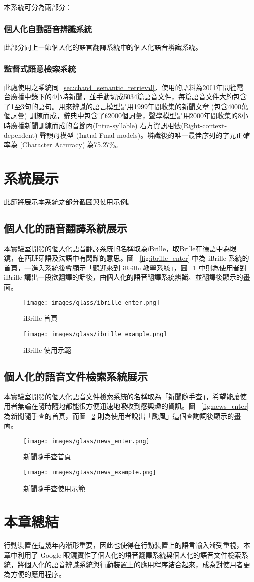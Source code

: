本系統可分為兩部分：

\subsubsection{個人化自動語音辨識系統}

此部分同上一節個人化的語言翻譯系統中的個人化語音辨識系統。

\subsubsection{監督式語意檢索系統}

此處使用之系統同~\ref{sec:chap4_semantic_retrieval}，使用的語料為2001年間從電台廣播中錄下的4小時新聞，並手動切成5034篇語音文件，每篇語音文件大約包含了1至3句的語句。用來辨識的語言模型是用1999年間收集的新聞文章 (包含4000萬個詞彙) 訓練而成，辭典中包含了62000個詞彙，聲學模型是用2000年間收集的8小時廣播新聞訓練而成的音節內(Intra-syllable)
右方資訊相依(Right-context-dependent) 聲韻母模型 (Initial-Final models)。辨識後的唯一最佳序列的字元正確率為 (Character Accuracy) 為75.27\%。
\section{系統展示}
此節將展示本系統之部分截圖與使用示例。

\subsection{個人化的語音翻譯系統展示}
本實驗室開發的個人化語音翻譯系統的名稱取為iBrille，取Brille在德語中為眼鏡，在西班牙語及法語中有閃耀的意思。圖 ~\ref{fig:ibrille_enter} 中為 iBrille 系統的首頁，一進入系統後會顯示「觀迎來到 iBrille 教學系統」，圖 ~\ref{fig:ibrille_example} 中則為使用者對 iBrille 講出一段欲翻譯的話後，由個人化的語音翻譯系統辨識、並翻譯後顯示的畫面。
\begin{figure}
\centering
\texttt{[image: images/glass/ibrille\_enter.png]}
\caption{iBrille 首頁} \label{fig:ibrille_enter}
\centering
\texttt{[image: images/glass/ibrille\_example.png]}
\caption{iBrille 使用示範} \label{fig:ibrille_example}
\end{figure}

\subsection{個人化的語音文件檢索系統展示}
本實驗室開發的個人化語音文件檢索系統的名稱取為「新聞隨手查」，希望能讓使用者無論在隨時隨地都能很方便迅速地吸收到感興趣的資訊。圖 ~\ref{fig:news_enter} 為新聞隨手查的首頁，而圖 ~\ref{fig:news_example} 則為使用者說出「颱風」這個查詢詞後顯示的畫面。
\begin{figure}
\centering
\texttt{[image: images/glass/news\_enter.png]}
\caption{新聞隨手查首頁} \label{fig:news_enter}
\centering
\texttt{[image: images/glass/news\_example.png]}
\caption{新聞隨手查使用示範} \label{fig:news_example}
\end{figure}

\section{本章總結}
行動裝置在這幾年內漸形重要，因此也使得在行動裝置上的語言輸入漸受重視，本章中利用了 Google 眼鏡實作了個人化的語音翻譯系統與個人化的語音文件檢索系統，將個人化的語音辨識系統與行動裝置上的應用程序結合起來，成為對使用者更為方便的應用程序。
